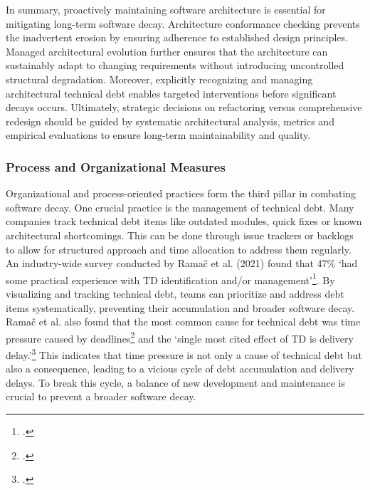 In summary, proactively maintaining software architecture is essential for mitigating long-term software decay. Architecture conformance checking 
prevents the inadvertent erosion by ensuring adherence to established design principles. Managed architectural evolution further ensures that the architecture
can sustainably adapt to changing requirements without introducing uncontrolled structural degradation. Moreover, explicitly recognizing and managing architectural
technical debt enables targeted interventions before significant decays occurs. Ultimately, strategic decisions on refactoring versus comprehensive redesign should be 
guided by systematic architectural analysis, metrics and empirical evaluations to ensure long-term maintainability and quality.

\subsubsection{Process and Organizational Measures}
Organizational and process-oriented practices form the third pillar in combating software decay.
One crucial practice is the management of technical debt. Many companies track technical debt items like outdated modules, quick fixes or known architectural shortcomings.
This can be done through issue trackers or backlogs to allow for structured approach and time allocation to address them regularly.
An industry-wide survey conducted by Ramač et al. (2021) found that 47\% `had some practical experience with TD identification and/or management'\footcite[40]{ramacPrevalenceCommonCauses2021}.
By visualizing and tracking technical debt, teams can prioritize and address debt items systematically, preventing their accumulation and broader software decay.
Ramač et al. also found that the most common cause for technical debt was time pressure caused by deadlines\footcite[40]{ramacPrevalenceCommonCauses2021} and the `single most cited effect of TD is delivery delay.'\footcite[40]{ramacPrevalenceCommonCauses2021}
This indicates that time pressure is not only a cause of technical debt but also a consequence, leading to a vicious cycle of debt accumulation and delivery delays. To break this cycle, a balance of new development and maintenance is crucial to prevent a broader software decay.\\

